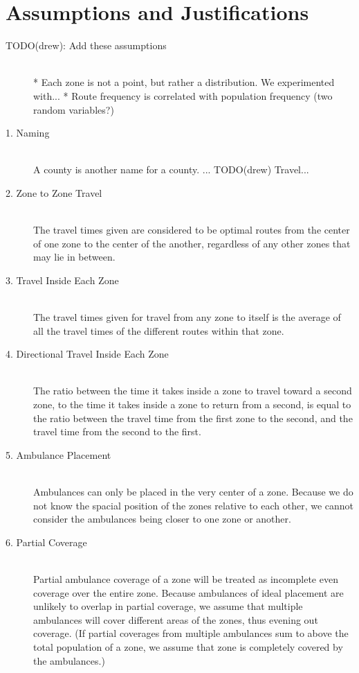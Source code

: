 \documentclass[notitlepage, 12pt]{article}
\begin{document}
\section{Assumptions and Justifications}
\begin{description}
    \item[TODO(drew): Add these assumptions] \hfill \\
    	* Each zone is not a point, but rather a distribution. We experimented with...
        * Route frequency is correlated with population frequency (two random variables?)
    \item[1. Naming] \hfill \\
    	A county is another name for a county. ... TODO(drew)
        Travel...
    \item[2. Zone to Zone Travel] \hfill \\
    	The travel times given are considered to be optimal routes from the center of one zone to
        the center of the another, regardless of any other zones that may lie in between.
    \item[3. Travel Inside Each Zone] \hfill \\
    	The travel times given for travel from any zone to itself is the average
        of all the travel times of the different routes within that zone.
    \item[4. Directional Travel Inside Each Zone] \hfill \\
    	The ratio between the time it takes inside a zone to travel toward a second zone,
        to the time it takes inside a zone to return from a second, is equal to the ratio
        between the travel time from the first zone to the second, and the travel time from the
        second to the first.
    \item[5. Ambulance Placement] \hfill \\
        Ambulances can only be placed in the very center of a zone. Because we do not know the
        spacial position of the zones relative to each other, we cannot consider the ambulances
        being closer to one zone or another.
    \item[6. Partial Coverage] \hfill \\
        Partial ambulance coverage of a zone will be treated as incomplete even coverage over the entire
        zone. Because ambulances of ideal placement are unlikely to overlap in partial coverage, we assume
        that multiple ambulances will cover different areas of the zones, thus evening out coverage.
        (If partial coverages from multiple ambulances sum to above the total population of a zone,
        we assume that zone is completely covered by the ambulances.)
\end{description}
\end{document}
